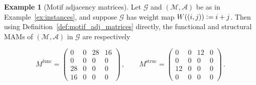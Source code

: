 \documentclass[12pt]{ociamthesis}
\theoremstyle{plain}
\theoremstyle{definition}
\newtheorem{example}{Example}[chapter]
\theoremstyle{remark}
\newcommand\ca[1]{\mathcal{#1}}
\begin{document}
\begin{example}[Motif adjacency matrices]
  \label{ex:motif_adj_matrices}
  Let $\ca{G}$ and $\ca{(M,A)}$ be as in Example~\ref{ex:instances}, and
  suppose $\ca{G}$ has weight map $W((i,j)) \vcentcolon = i + j$. Then using
  Definition~\ref{def:motif_adj_matrices} directly, the functional and
  structural MAMs of $\ca{(M,A)}$ in $\ca{G}$ are respectively

  \vspace*{0.2cm}
  $$ %
  M^\mathrm{func} =
  \begin{pmatrix}
    0  & 0  & 28 & 16 \\
    0  & 0  & 0  & 0  \\
    28 & 0  & 0  & 0  \\
    16 & 0  & 0  & 0
  \end{pmatrix} \,,
  \qquad
  M^\mathrm{struc} =
  \begin{pmatrix}
    0  & 0  & 12 & 0  \\
    0  & 0  & 0  & 0  \\
    12 & 0  & 0  & 0  \\
    0  & 0  & 0  & 0
  \end{pmatrix}\,.
  $$
\end{example}

\pagebreak
\end{document}
